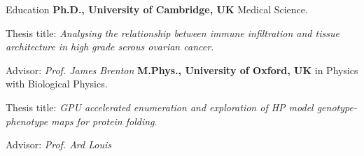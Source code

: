 \begin{rubric}{Education}
\entry*[2015 -- 2020]%
	\textbf{Ph.D., University of Cambridge, UK} Medical Science.
	\par Thesis title: \emph{Analysing the relationship between immune infiltration and tissue architecture in high grade serous ovarian cancer.}
        \par Advisor: \emph{Prof. James Brenton}
%
\entry*[2011 -- 2015]%
	\textbf{M.Phys., University of Oxford, UK} in Physics with Biological Physics.\par
	Thesis title: \emph{GPU accelerated enumeration and exploration of HP model genotype-phenotype maps for protein folding}.
    \par Advisor: \emph{Prof. Ard Louis}
% 
\end{rubric}